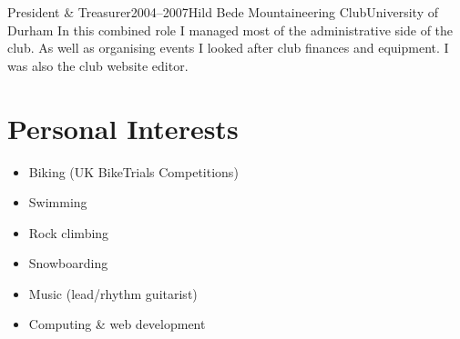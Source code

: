 \documentclass{cv}
\begin{document}
\begin{experience}{President \& Treasurer}{2004--2007}{Hild Bede Mountaineering Club}{University of Durham}
In this combined role I managed most of the administrative side of the club. As well as organising events I looked after club finances and equipment. I was also the club website editor.
\end{experience}

\section{Personal Interests}

\begin{itemize}
\item Biking (UK BikeTrials Competitions)
\item Swimming
\item Rock climbing
\item Snowboarding
\item Music (lead/rhythm guitarist)
\item Computing \& web development
\end{itemize}
\end{document}
